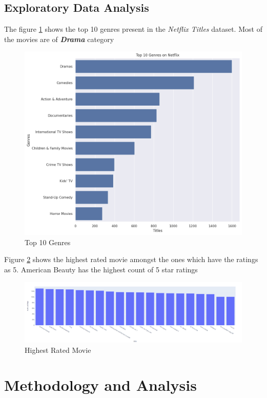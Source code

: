 \documentclass[a4paper,10pt]{article}
\begin{document}
\subsection{Exploratory Data Analysis}
The figure \ref{genre} shows the top 10 genres present in the \textit{Netflix Titles} dataset. Most of the movies are of \textbf{\textit{Drama}} category

\begin{figure}[H]
    \centering
    \includegraphics[width=12 cm]{genre.png}
    \caption{Top 10 Genres}
    \label{genre}
\end{figure}

\vspace{2pt}
Figure \ref{highest} shows the highest rated movie amongst the ones which have the ratings as 5. American Beauty has the highest count of 5 star ratings

\begin{figure} [H]
    \centering
    \includegraphics[width=15 cm]{highest_rated.png}
    \caption{Highest Rated Movie}
    \label{highest}
\end{figure}
\section{Methodology and Analysis}
\end{document}
